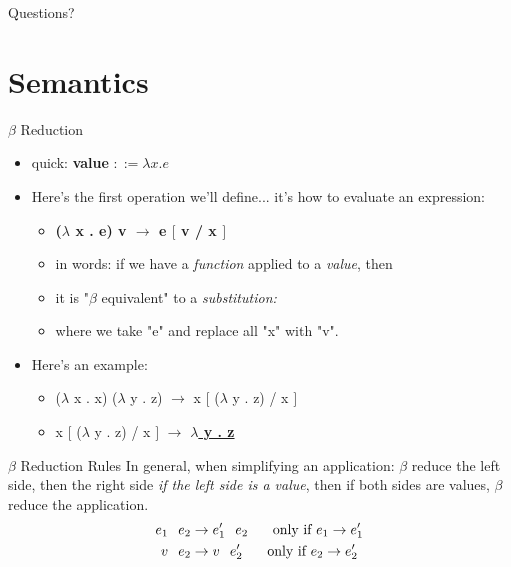 \documentclass[aspectratio=169]{beamer}
\begin{document}
\begin{frame}{}
    \begin{center}
        {\color{sigma@mainblue} \LARGE Questions?}
    \end{center}
\end{frame}

\section{Semantics}
\frame{\sectionpage}

\begin{frame}{$\beta$ Reduction}
    \begin{itemize}
    \item quick: \textbf{value} $::= \lambda x . e$
    \item Here's the first operation we'll define... it's how to evaluate an expression: \pause
    \begin{itemize}
        \item \textbf{($\lambda$ x . e) v $\to$ e $[$ v / x $]$}
        \item in words: if we have a \textit{function} applied to a \textit{value}, then
        \item it is "$\beta$ equivalent" to a \textit{substitution:}
        \item where we take "e" and replace all "x" with "v". \pause
    \end{itemize}
    \item Here's an example: 
    \begin{itemize}
        \item ($\lambda$ x . x) ($\lambda$ y . z)   $\to$ x   $[$ ($\lambda$ y . z) / x $]$ \pause
        \item x $[$ ($\lambda$ y . z) / x $]$   $\to$   \underline{\textbf{$\lambda$ y . z}}
    \end{itemize}
    \end{itemize}
\end{frame}

\begin{frame}{$\beta$ Reduction Rules}
In general, when simplifying an application: $\beta$ reduce the left side, then the right side \textit{if the left side is a value}, then if both sides are values, $\beta$ reduce the application.
\begin{align*}
    e_1 \hspace{0.1in} e_2 & \to e'_1 \hspace{0.1in} e_2 \hspace{0.2in} \text{ only if $e_1 \to e_1'$} \\
    v \hspace{0.1in} e_2 & \to v \hspace{0.1in} e_2' \hspace{0.2in} \text{ only if $e_2 \to e_2'$} \\
\end{align*}
\end{frame}
\end{document}
